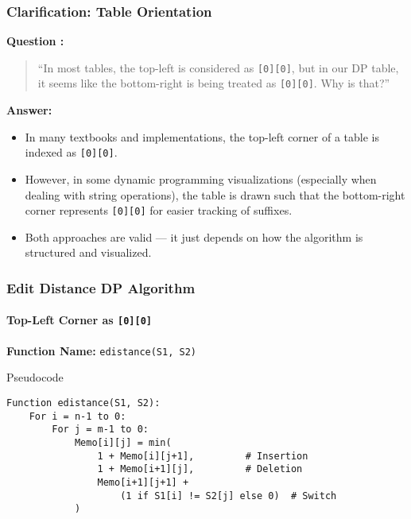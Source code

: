 \documentclass[10pt,aspectratio=43]{beamer}
\begin{document}
\begin{frame}
\frametitle{Clarification: Table Orientation}

\textbf{Question :}  
\begin{quote}
“In most tables, the top-left is considered as \texttt{[0][0]}, but in our DP table, it seems like the bottom-right is being treated as \texttt{[0][0]}. Why is that?”
\end{quote}

\vspace{0.3cm}
\textbf{Answer:}
\begin{itemize}
    \item In many textbooks and implementations, the top-left corner of a table is indexed as \texttt{[0][0]}.
    \item However, in some dynamic programming visualizations (especially when dealing with string operations), the table is drawn such that the bottom-right corner represents \texttt{[0][0]} for easier tracking of suffixes.
    \item Both approaches are valid — it just depends on how the algorithm is structured and visualized.
\end{itemize}

\end{frame}



\begin{frame}[fragile]
    \frametitle{Edit Distance DP Algorithm}
    \framesubtitle{Top-Left Corner as \texttt{[0][0]}}

    \textbf{Function Name:} \texttt{edistance(S1, S2)}

    \begin{block}{Pseudocode}
    \begin{verbatim}
Function edistance(S1, S2):
    For i = n-1 to 0:
        For j = m-1 to 0:
            Memo[i][j] = min(
                1 + Memo[i][j+1],         # Insertion
                1 + Memo[i+1][j],         # Deletion
                Memo[i+1][j+1] + 
                    (1 if S1[i] != S2[j] else 0)  # Switch
            )
    \end{verbatim}
    \end{block}
\end{frame}
\end{document}
